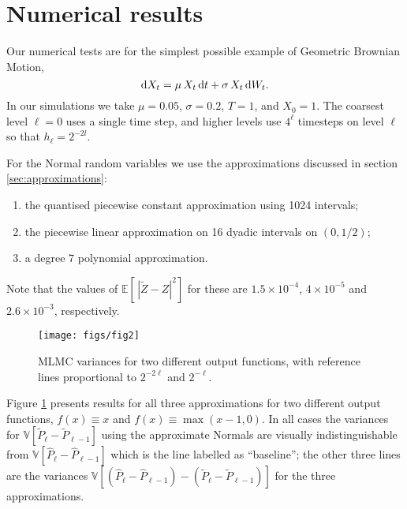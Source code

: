 \documentclass[11pt]{article}
\def \EE {{\mathbb{E}}}
\def \VV {{\mathbb{V}}}
\def \D {{\rm d}}
\def \tP {{\widetilde{P}}}
\def \tZ {{\widetilde{Z}}}
\def \hP {{\widehat{P}}}
\begin{document}
\section{Numerical results}

Our numerical tests are for the simplest possible example
of Geometric Brownian Motion,
\begin{equation*}
\label{eqt:gbm_sde}
\D X_t = \mu\, X_t\, \D t + \sigma\, X_t\, \D W_t.
\end{equation*}
In our simulations we take $\mu\!=\!0.05$, $\sigma\!=\!0.2$,
$T\!=\!1$, and $X_0\!=\!1$. The coarsest level $\ell\!=\!0$
uses a single time step, and higher levels use $4^\ell$
timesteps on level $\ell$ so that $h_\ell \!=\! 2^{-2l} $.

For the Normal random variables we use the 
approximations discussed in section \ref{sec:approximations}:
\begin{enumerate}\setlength{\itemsep}{-0.02in}
\item the quantised piecewise constant approximation using 1024 intervals;
\item the piecewise linear approximation on 16 dyadic intervals
on $(0,1/2)$;
\item a degree 7 polynomial approximation.
\end{enumerate}
Note that the values of $\EE[\, | \tZ{-}Z|^2 ]$ for these are
$1.5\!\times\!10^{-4}$, $4\!\times\!10^{-5}$ and $2.6\!\times\!10^{-3}$, respectively.

\begin{figure}[tb]
\centering
\texttt{[image: figs/fig2]}
\caption{MLMC variances for two different output functions, with
  reference lines proportional to $2^{-2\ell}$ and $2^{-\ell}$.}
\label{fig:numeric_results}
\end{figure}

Figure \ref{fig:numeric_results} presents results for all
three approximations for two different output functions,
$f(x) {\equiv} x$ and $f(x) {\equiv} \max(x{-}1,0)$.
In all cases the variances for $\VV[\tP_\ell{-}\tP_{\ell-1}]$
using the approximate Normals are visually indistinguishable
from $\VV[\hP_\ell{-}\hP_{\ell-1}]$ which is the line labelled
as ``baseline''; the other three lines are the variances
$\VV[(\hP_\ell{-}\hP_{\ell-1}) - (\tP_\ell{-}\tP_{\ell-1})]$
for the three approximations.
\end{document}
